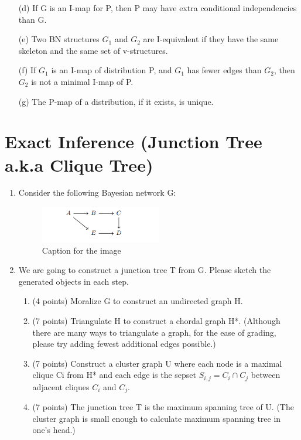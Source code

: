 \documentclass[a3paper,12pt]{extarticle} %
\begin{document}
\begin{enumerate}
\begin{enumerate}
        \item[(d)] If G is an I-map for P, then P may have extra conditional independencies than G.
        \item[(e)] Two BN structures $G_1$ and $G_2$ are I-equivalent if they have the same skeleton and the same set of v-structures.
        \item[(f)] If $G_1$ is an I-map of distribution P, and $G_1$ has fewer edges than $G_2$, then $G_2$ is not a minimal I-map of P.
        \item[(g)] The P-map of a distribution, if it exists, is unique.
    \end{enumerate}
\end{enumerate}
\section{Exact Inference (Junction Tree a.k.a Clique Tree)}
\begin{enumerate}
    \item Consider the following Bayesian network G:
    \begin{figure}[h!]
        \centering
        \includegraphics[width=0.5\textwidth]{junction_tree.png}
        \caption{Caption for the image}
        \label{fig:example_image}
    \end{figure}
    \item We are going to construct a junction tree T from G. Please sketch the generated objects in each step.
    \begin{enumerate}
        \item (4 points) Moralize G to construct an undirected graph H.
        \item (7 points) Triangulate H to construct a chordal graph H*.
        (Although there are many ways to triangulate a graph, for the ease of grading, please try adding fewest
        additional edges possible.)
        \item (7 points) Construct a cluster graph U where each node is a maximal clique Ci from H* and each edge is the sepset \(S_{i,j} = C_i \cap C_j\) between adjacent cliques \(C_i\) and \(C_j\).
        \item (7 points) The junction tree T is the maximum spanning tree of U.
        (The cluster graph is small enough to calculate maximum spanning tree in one’s head.)
    \end{enumerate}
\end{enumerate}
\end{document}
